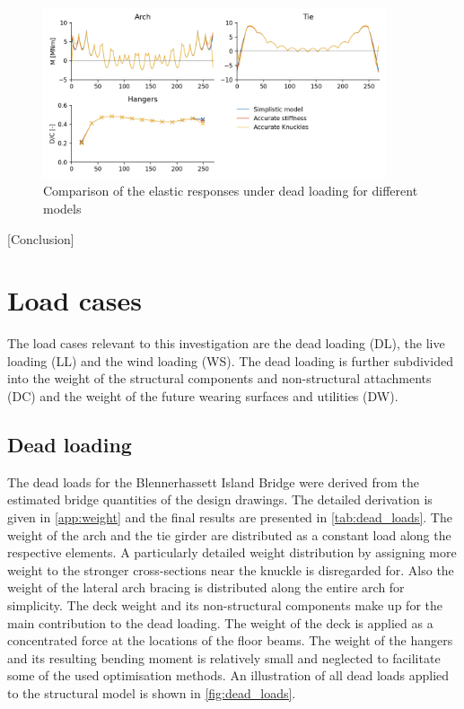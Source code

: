 \begin{figure}[H]
    \centering
    \includegraphics[width=0.9\textwidth]{calculations/model comparison/dead_loading.png}
    \caption{Comparison of the elastic responses under dead loading for different models}
    \label{fig:model_comparison}
\end{figure}

[Conclusion]

\newpage
\section{Load cases} \label{sec:met_loads}
The load cases relevant to this investigation are the dead loading (DL), the live loading (LL) and the wind loading (WS). The dead loading is further subdivided into the weight of the structural components and non-structural attachments (DC) and the weight of the future wearing surfaces and utilities (DW).

\subsection{Dead loading}
The dead loads for the Blennerhassett Island Bridge were derived from the estimated bridge quantities of the design drawings. The detailed derivation is given in \cref{app:weight} and the final results are presented in \cref{tab:dead_loads}. The weight of the arch and the tie girder are distributed as a constant load along the respective elements. A particularly detailed weight distribution by assigning more weight to the stronger cross-sections near the knuckle is disregarded for. Also the weight of the lateral arch bracing is distributed along the entire arch for simplicity. The deck weight and its non-structural components make up for the main contribution to the dead loading. The weight of the deck is applied as a concentrated force at the locations of the floor beams. The weight of the hangers and its resulting bending moment is relatively small and neglected to facilitate some of the used optimisation methods. An illustration of all dead loads applied to the structural model is shown in \cref{fig:dead_loads}.

